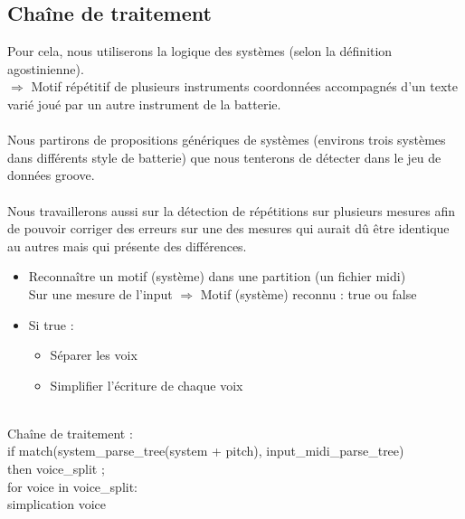 \subsection{Chaîne de traitement}
Pour cela, nous utiliserons la logique des systèmes (selon la définition agostinienne).\\$\Rightarrow$ Motif répétitif de plusieurs instruments coordonnées accompagnés d’un texte varié joué par un autre instrument de la batterie.\\\\Nous partirons de propositions génériques de systèmes (environs trois systèmes dans différents style de batterie) que nous tenterons de détecter dans le jeu de données groove.\\\\
Nous travaillerons aussi sur la détection de répétitions sur plusieurs mesures afin de pouvoir corriger des erreurs sur une des mesures qui aurait dû être identique au autres mais qui présente des différences.
\begin{itemize}
	\item Reconnaître un motif (système) dans une partition (un fichier midi)\\
	Sur une mesure de l’input $\Rightarrow$ Motif (système) reconnu : true ou false
	\item Si true : 
	\begin{itemize}
		\item Séparer les voix
		\item Simplifier l’écriture de chaque voix\\\\
	\end{itemize}
\end{itemize}
Chaîne de traitement :\\
if match(system\_parse\_tree(system + pitch), input\_midi\_parse\_tree)\\
\tab then voice\_split ;\\
\tab for voice in voice\_split:\\
\tab \tab simplication voice

